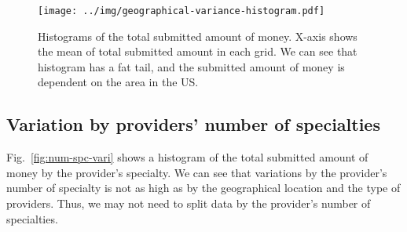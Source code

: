 \documentclass[dvipdfmx, english]{ampmt}             %
\newcommand{\Figref}[1]{Fig.~\ref{#1}}
\begin{document}
\begin{figure}[H]
\centerline{\texttt{[image: ../img/geographical-variance-histogram.pdf]}}
\caption{Histograms of the total submitted amount of money. X-axis shows the mean of total submitted amount in each grid. We can see that histogram has a fat tail, and the submitted amount of money is dependent on the area in the US.}
\label{fig:geo-vari-his}
\end{figure}




\subsection*{Variation by providers’{} number of specialties}
\Figref{fig:num-spc-vari} shows a histogram of the total submitted amount of money by the provider’{}s specialty. We can see that variations by the provider’s number of specialty is not as high as by the geographical location and the type of providers. Thus, we may not need to split data by the provider'{}s number of specialties.
\end{document}
